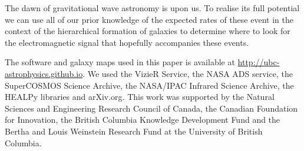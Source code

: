\documentclass[useAMS,usenatbib]{mn2e}
\begin{document}
The dawn of gravitational wave astronomy is upon us.  To realise its
full potential we can use all of our prior knowledge of the expected
rates of these event in the context of the hierarchical formation of
galaxies to determine where to look for the electromagnetic signal
that hopefully accompanies these events.


The software and galaxy maps used in this paper is available at
\url{http://ubc-astrophysics.github.io}.  We used the VizieR Service,
the NASA ADS service, the SuperCOSMOS Science Archive, the NASA/IPAC
Infrared Science Archive, the HEALPy libraries and arXiv.org. This work
was supported by the Natural Sciences and Engineering Research Council
of Canada, the Canadian Foundation for Innovation, the British
Columbia Knowledge Development Fund and the Bertha and Louis Weinstein
Research Fund at the University of British Columbia.






\label{lastpage}
\end{document}
